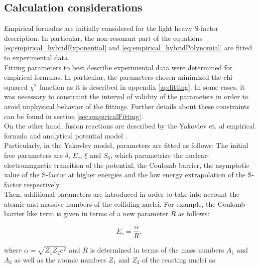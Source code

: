 \documentclass[openany]{book}
\begin{document}
 
\subsection{Calculation considerations} \label{sub:considerationsNonResonant}

Empirical formulas are initially considered for the light heavy S-factor description. In particular, the non-resonant part of the equations \ref{eq:empirical_hybridExponential}  and \ref{eq:empirical_hybridPolynomial} are fitted to experimental data.  \\

Fitting parameters to best describe experimental data were determined for empirical formulas. In particular, the parameters chosen minimized the chi-squared $\chi^2$ function as it is described in appendix \ref{ap:fitting}. In some cases, it was necessary to constraint the interval of validity of the parameters in order to avoid unphysical behavior of the fittings. Further details about these constraints can be found in section \ref{sec:empiricalFitting}. \\

On the other hand, fusion reactions are described by the Yakovlev et. al empirical formula \cite{beard_afanasjev_chamon_gasques_wiescher_yakovlev_2010} and analytical potential model  \cite{yakovlev_beard_gasques_wiescher_2010}.  \\

Particularly, in the Yakovlev model, parameters are fitted as follows: The initial free parameters are $\delta$, $E_c$,  $\xi$ and $S_0$, which parametrize the nuclear-electromagnetic transition of the potential, the Coulomb barrier, the asymptotic value of the S-factor at higher energies and the low energy extrapolation of the S-factor respectively.  \\

Then, additional parameters are introduced in order to take into account the atomic and massive numbers of the colliding nuclei. For example, the Coulomb barrier like term is given in terms of a new parameter $R$ as follows:

\begin{equation} \label{eq:potential_Yakovlev_Ec}
	E_c = \frac{\alpha}{R},
\end{equation}

where $\alpha = \sqrt{Z_1Z_2e^2}$ and $R$ is determined in terms of the mass numbers $A_1$ and $A_2$ as well as the atomic numbers $Z_1$ and $Z_2$ of the reacting nuclei as:
\end{document}

